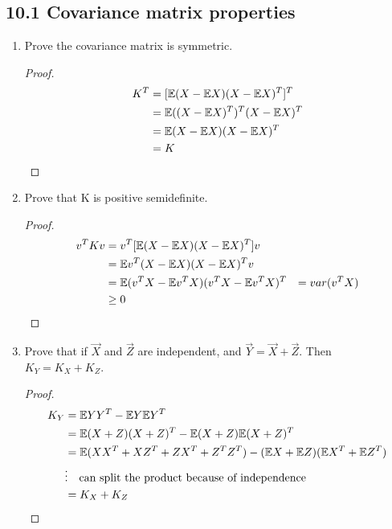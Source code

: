 \documentclass[../main.tex]{subfiles}
\begin{document}
\subsection*{10.1 Covariance matrix properties}
\begin{enumerate}
    \item Prove the covariance matrix is symmetric. 
    \begin{proof}
    \begin{align*}
        K^T &= [\mathbb{E} (X-\mathbb{E} X) (X-\mathbb{E} X)^T]^T \\
        &= \mathbb{E} ((X-\mathbb{E} X)^T)^T(X-\mathbb{E} X)^T\\
        &= \mathbb{E} (X-\mathbb{E} X)(X-\mathbb{E} X)^T\\
        &= K
    \end{align*}
    \end{proof}
    
    \item Prove that K is positive semidefinite. 
        \begin{proof}
            \begin{align*}
                v^T K v&= v^T [\mathbb{E} (X-\mathbb{E} X) (X-\mathbb{E} X)^T] v\\
                &=  \mathbb{E} v^T(X-\mathbb{E} X) (X-\mathbb{E} X)^Tv\\
                &= \mathbb{E} (v^TX-\mathbb{E} v^TX)(v^TX - \mathbb{E} v^TX)^T
                &= var(v^T X)\\
                &\geq 0
            \end{align*}
        \end{proof}
    \item Prove that if $\vec X$ and $\vec Z$ are independent, and $\vec Y=\vec X + \vec Z$. Then $K_Y=K_X+K_Z$.
        \begin{proof}
            \begin{align*}
                K_Y &= \mathbb{E} YY^T - \mathbb{E} Y \mathbb{E} Y^T \\
                &= \mathbb{E} (X+Z)(X+Z)^T - \mathbb{E} (X+Z)\mathbb{E}(X+Z)^T \\
                &= \mathbb{E} (XX^T+XZ^T+Z X^T+Z^TZ^T) - (\mathbb{E} X+\mathbb{E} Z)(\mathbb{E} X^T + \mathbb{E} Z^T)\\
                &\vdots \quad \text{can split the product because of independence}\\
                &=K_X+K_Z 
            \end{align*}
        \end{proof}
\end{enumerate}
\end{document}
